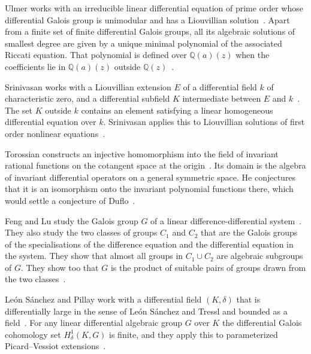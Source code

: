 Ulmer works with an irreducible linear differential equation of prime order
whose differential Galois group is unimodular and has a Liouvillian solution~\cite{WlIrreducibleLinearDifferentialE1994}.
Apart from a finite set of finite differential Galois
groups, all its algebraic solutions of smallest degree are given by a unique
minimal polynomial of the associated Riccati equation. That polynomial is %
defined over $\mathbb{Q}(a)(z)$ when the coefficients lie in
$\mathbb{Q}(a)(z)$ outside
$\mathbb{Q}(z)$~\cite{WlIrreducibleLinearDifferentialE1994}.

Srinivasan works with a Liouvillian extension $E$ of a differential field
$k$ of characteristic zero, and a differential subfield $K$ intermediate
between $E$ and $k$~\cite{WlLiouvillianSolutionsOfFirstOrd2017}. The set $K$ outside $k$ contains an element satisfying a
linear homogeneous differential equation over $k$. Srinivasan applies this to
Liouvillian solutions of first order nonlinear
equations~\cite{WlLiouvillianSolutionsOfFirstOrd2017}.

Torossian constructs an injective homomorphism into the field of
invariant rational functions on the cotangent space at the origin~\cite{WlInvariantDifferentialOperators1993}. Its domain
is the algebra of invariant differential operators on a general symmetric
space. He conjectures that it is an isomorphism onto the invariant polynomial
functions there, which would settle a conjecture of
Duflo~\cite{WlInvariantDifferentialOperators1993}.

Feng and Lu study the Galois group $G$ of a linear difference-differential
system~\cite{WlGaloisGroupsOfLinearDifference2023}. They also study the two classes of groups $C_1$ and $C_2$ that are the
Galois groups of the specialisations of the difference equation and the
differential equation in the system. They show that almost all groups in
$C_1\cup C_2$ are
algebraic subgroups of $G$. They show too that $G$ is the product of suitable
pairs of groups drawn from the two
classes~\cite{WlGaloisGroupsOfLinearDifference2023}.

Le\'on S\'anchez and Pillay work with a differential field $(K,\delta)$ that is
differentially large in the sense of Le\'on S\'anchez and Tressl and bounded
as a field~\cite{WlDifferentialGaloisCohomologyAn2021}. For any linear differential algebraic group $G$ over $K$ the
differential Galois cohomology set $H^1_\delta(K,G)$ is finite, and they apply
this to parameterized Picard--Vessiot
extensions~\cite{WlDifferentialGaloisCohomologyAn2021}.

